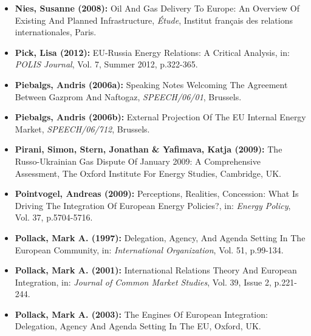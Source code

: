 \documentclass[11pt,a4paper,english]{scrreprt}
\begin{document}
\begin{itemize}
	\item [\Rectsteel] \textbf{Nies, Susanne (2008):} Oil And Gas Delivery
To Europe: An Overview Of Existing And Planned Infrastructure,
\textsl{\'{E}tude}, Institut fran\c{c}ais des relations internationales, Paris.


	\item [\Rectsteel] \textbf{Pick, Lisa (2012):} EU-Russia Energy
Relations: A Critical Analysis, in: \textsl{POLIS Journal}, Vol. 7, Summer 2012,
p.322-365.



	\item [\Rectsteel] \textbf{Piebalgs, Andris (2006a):} Speaking Notes 
Welcoming The Agreement Between Gazprom And Naftogaz, \textsl{SPEECH/06/01},
Brussels.



	\item [\Rectsteel] \textbf{Piebalgs, Andris (2006b):} External
Projection Of The EU Internal Energy Market, \textsl{SPEECH/06/712}, Brussels.



	\item [\Rectsteel] \textbf{Pirani, Simon, Stern, Jonathan \& Yafimava,
Katja (2009):} The Russo-Ukrainian Gas Dispute Of January 2009: A Comprehensive
Assessment, The Oxford Institute For Energy Studies, Cambridge, UK.



	\item [\Rectsteel] \textbf{Pointvogel, Andreas (2009):} Perceptions,
Realities, Concession: What Is Driving The Integration Of European Energy
Policies?, in: \textsl{Energy Policy}, Vol. 37, p.5704-5716.



	\item [\Rectsteel] \textbf{Pollack, Mark A. (1997):} Delegation, Agency,
And Agenda Setting In The European Community, in: \textsl{International
Organization}, Vol. 51, p.99-134.



	\item [\Rectsteel] \textbf{Pollack, Mark A. (2001):} International
Relations Theory And European Integration, in: \textsl{Journal of Common
Market Studies}, Vol. 39, Issue 2, p.221-244.



	\item [\Rectsteel] \textbf{Pollack, Mark A. (2003):} The Engines Of
European Integration: Delegation, Agency And Agenda Setting In The EU, Oxford,
UK.




\end{itemize}
\end{document}
